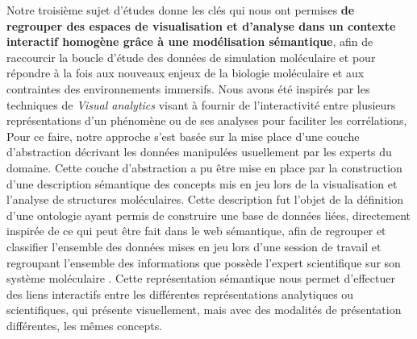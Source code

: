 Notre troisième sujet d'études donne les clés qui nous ont permises \textbf{de regrouper des espaces de visualisation et d'analyse dans un contexte interactif homogène grâce à une modélisation sémantique}, afin de raccourcir la boucle d'étude des données de simulation moléculaire et pour répondre à la fois aux nouveaux enjeux de la biologie moléculaire et aux contraintes des environnements immersifs. %
Nous avons été inspirés par les techniques de \textit{Visual analytics} visant à fournir de  l'interactivité entre plusieurs représentations d'un phénomène ou de ses analyses pour faciliter les corrélations, \cite{kielman2009foundations}
Pour ce faire, notre approche s'est basée sur la mise place d'une couche d'abstraction décrivant les données manipulées usuellement par les experts du domaine. Cette couche d'abstraction a pu être mise en place par la construction d'une description sémantique des concepts mis en jeu lors de la visualisation et l'analyse de structures moléculaires. Cette description fut l'objet de la définition d'une ontologie ayant permis de construire une base de données liées, directement inspirée de ce qui peut être fait dans le web sémantique, afin de regrouper et classifier l'ensemble des données mises en jeu lors d'une session de travail et regroupant l'ensemble des informations que possède l'expert scientifique sur son système moléculaire \cite{berners2001semantic}. Cette représentation sémantique nous permet d'effectuer des liens interactifs entre les différentes représentations analytiques ou scientifiques, qui présente visuellement, mais avec des modalités de présentation différentes, les mêmes concepts.



